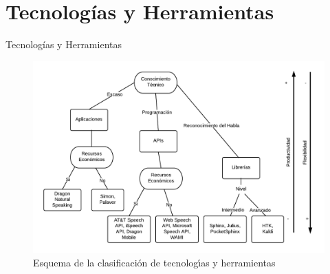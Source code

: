 \section{Tecnolog\'ias y Herramientas}

\begin{frame}{Tecnolog\'ias y Herramientas}

\begin{figure}[H]
\centering
\includegraphics[width=0.8\linewidth]{./graphics/esquema-herramientas.png}
\caption{Esquema de la clasificaci\'on de tecnolog{\'\i}as y herramientas}
\label{figure:esquema-herramientas}
\end{figure}
\end{frame}